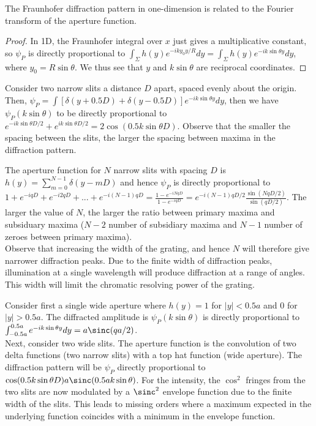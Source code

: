 \documentclass[a4paper]{article}
\begin{document}
\begin{thm}
The Fraunhofer diffraction pattern in one-dimension is related to the Fourier transform of the aperture function.
\end{thm}
\begin{proof}
In 1D, the Fraunhofer integral over $x$ just gives a multiplicative constant, so $\psi_P$ is directly proportional to $\int_\Sigma h(y)e^{-iky_0y/R}dy=\int_\Sigma h(y)e^{-ik\sin\theta y}dy$, where $y_0=R\sin\theta$. We thus see that $y$ and $k\sin\theta$ are reciprocal coordinates. 
\end{proof}
\begin{eg}
Consider two narrow slits a distance $D$ apart, spaced evenly about the origin. Then, $\psi_P=\int[\delta(y+0.5D)+\delta(y-0.5D)]e^{-ik\sin\theta y}dy$, then we have $\psi_P(k\sin\theta)$ to be directly proportional to $e^{-ik\sin\theta D/2}+e^{ik\sin\theta D/2}=2\cos(0.5k\sin\theta D)$. Observe that the smaller the spacing between the slits, the larger the spacing between maxima in the diffraction pattern.
\end{eg}
\begin{eg}[Grating]
The aperture function for $N$ narrow slits with spacing $D$ is $h(y)=\sum_{m=0}^{N-1}\delta(y-mD)$ and hence $\psi_P$ is directly proportional to $1+e^{-iqD}+e^{-i2qD}+...+e^{-i(N-1)qD}=\frac{1-e^{-iNqD}}{1-e^{-iqD}}=e^{-i(N-1)qD/2}\frac{\sin(NqD/2)}{\sin(qD/2)}$. The larger the value of $N$, the larger the ratio between primary maxima and subsiduary maxima ($N-2$ number of subsidiary maxima and $N-1$ number of zeroes between primary maxima).\\[5pt]
Observe that increasing the width of the grating, and hence $N$ will therefore give narrower diffraction peaks. Due to the finite width of diffraction peaks, illumination at a single wavelength will produce diffraction at a range of angles. This width will limit the chromatic resolving power of the grating.
\end{eg}
\begin{eg}
Consider first a single wide aperture where $h(y)=1$ for $|y|<0.5a$ and $0$ for $|y|>0.5a$. The diffracted amplitude is $\psi_P(k\sin\theta)$ is directly proportional to $\int_{-0.5a}^{0.5a}e^{-ik\sin\theta y}dy=a\sinc(qa/2)$.\\[5pt]
Next, consider two wide slits. The aperture function is the convolution of two delta functions (two narrow slits) with a top hat function (wide aperture). The diffraction pattern will be $\psi_P$ directly proportional to $\cos(0.5k\sin\theta D)a\sinc(0.5ak\sin\theta)$. For the intensity, the $\cos^2$ fringes from the two slits are now modulated by a $\sinc^2$ envelope function due to the finite width of the slits. This leads to missing orders where a maximum expected in the underlying function coincides with a minimum in the envelope function.
\end{eg}
\end{document}
